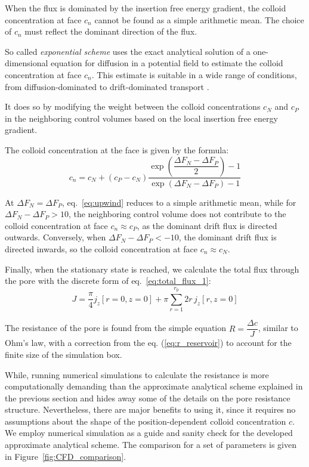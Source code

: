 \documentclass[10pt, a4paper]{article}
\begin{document}
\begin{multicols}{2}
When the flux is dominated by the insertion free energy gradient, the colloid concentration at face $c_n$ cannot be found as a simple arithmetic mean.
The choice of $c_n$ must reflect the dominant direction of the flux.

So called \emph{exponential scheme} uses the exact analytical solution of a one-dimensional equation for diffusion in a potential field to estimate the colloid concentration at face $c_n$.
This estimate is suitable in a wide range of conditions, from diffusion-dominated to drift-dominated transport \cite{Patankar1980,Versteeg2007}.

It does so by modifying the weight between the colloid concentrations $c_N$ and $c_P$ in the neighboring control volumes based on the local insertion free energy gradient.

The colloid concentration at the face is given by the formula:
\begin{equation}
    \label{eq:upwind}
    c_n = c_N + (c_P - c_N) \frac{\exp\left( \dfrac{\Delta F_N - \Delta F_P}{2} \right) - 1}{\exp\left( \Delta F_N - \Delta F_P \right) - 1}
\end{equation}

At $\Delta F_N = \Delta F_P$, eq.~\ref{eq:upwind} reduces to a simple arithmetic mean, while for $\Delta F_N - \Delta F_P > 10$, the neighboring control volume does not contribute to the colloid concentration at face $c_n \approx c_P$, as the dominant drift flux is directed outwards.
Conversely, when $\Delta F_N - \Delta F_P < -10$, the dominant drift flux is directed inwards, so the colloid concentration at face $c_n \approx c_N$.




Finally, when the stationary state is reached, we calculate the total flux through the pore with the discrete form of eq.~\ref{eq:total_flux_1}:
\begin{equation}
    \label{eq:total_flux_2}
    J = \frac{\pi}{4} j_z[ r = 0, z = 0 ] + \pi \sum_{r = 1}^{r_{\text{p}}} 2 r \, j_z[ r, z = 0 ]
\end{equation}

The resistance of the pore is found from the simple equation $R = \dfrac{\Delta c}{J}$, similar to Ohm's law, with a correction from the eq. (\ref{eq:r_reservoir}) to account for the finite size of the simulation box.

While, running numerical simulations to calculate the resistance is more computationally demanding than the approximate analytical scheme explained in the previous section and hides away some of the details on the pore resistance structure.
Nevertheless, there are major benefits to using it, since it requires no assumptions about the shape of the position-dependent colloid concentration $c$.
We employ numerical simulation as a guide and sanity check for the developed approximate analytical scheme.
The comparison for a set of parameters is given in Figure~\ref{fig:CFD_comparison}.


\end{multicols}
\end{document}
